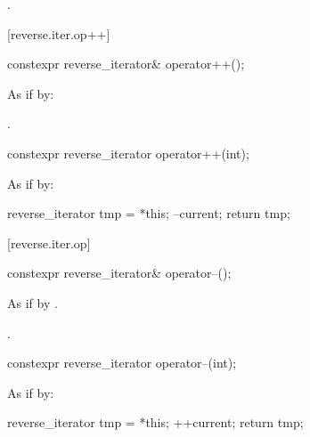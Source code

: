 \begin{itemdescr}
\pnum
\returns {}.
\end{itemdescr}

[reverse.iter.op++]{}

%
\begin{itemdecl}
constexpr reverse_iterator& operator++();
\end{itemdecl}

\begin{itemdescr}
\pnum
\effects
As if by: 

\pnum
\returns
{}.
\end{itemdescr}

%
\begin{itemdecl}
constexpr reverse_iterator operator++(int);
\end{itemdecl}

\begin{itemdescr}
\pnum
\effects
As if by:
\begin{codeblock}
reverse_iterator tmp = *this;
--current;
return tmp;
\end{codeblock}
\end{itemdescr}

[reverse.iter.op\dcr]{}

%
\begin{itemdecl}
constexpr reverse_iterator& operator--();
\end{itemdecl}

\begin{itemdescr}
\pnum
\effects
As if by .

\pnum
\returns
{}.
\end{itemdescr}

%
\begin{itemdecl}
constexpr reverse_iterator operator--(int);
\end{itemdecl}

\begin{itemdescr}
\pnum
\effects
As if by:
\begin{codeblock}
reverse_iterator tmp = *this;
++current;
return tmp;
\end{codeblock}
\end{itemdescr}

